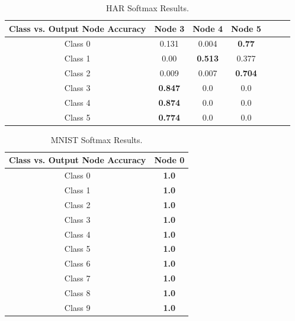 \documentclass[journal]{IEEEtran}
\begin{document}
  \begin{table}[!ht]
    \renewcommand{\arraystretch}{1.3}
    \caption{HAR Softmax Results.}
    \label{tab_har_sfx}
    \centering
    \begin{tabular}{|c|c|c|c|c|c|c|}
    \hline
    Class vs. Output Node Accuracy & Node 3 & Node 4 & Node 5\\
    \hline
    \hline
    Class 0    & 0.131  &  0.004    & \textbf{0.77}\\
    \hline
    Class 1    & 0.00  &  \textbf{0.513}    & 0.377\\
    \hline
    Class 2   & 0.009  &  0.007    & \textbf{0.704}\\
    \hline
    Class 3   & \textbf{0.847}  &  0.0    & 0.0\\
    \hline
    Class 4  & \textbf{0.874 } &  0.0    & 0.0\\
    \hline
    Class 5    & \textbf{0.774  }&  0.0    & 0.0\\
    \hline
    \end{tabular}
    \end{table}
    \begin{table}
      \renewcommand{\arraystretch}{1.3}
      \caption{MNIST Softmax Results.}
      \label{tab_mnist_sfx_all}
      \centering
      \begin{tabular}{|c|c|}
      \hline
      Class vs. Output Node Accuracy & Node 0 \\
      \hline
      \hline
      Class 0   &  \textbf{1.0}   \\
      \hline
      Class 1   &  \textbf{1.0}   \\
      \hline
      Class 2   &  \textbf{1.0}   \\
      \hline
      Class 3   &  \textbf{1.0}  \\
      \hline
      Class 4   &  \textbf{1.0}  \\
      \hline
      Class 5   &  \textbf{1.0}  \\
      \hline
      Class 6   &  \textbf{1.0}   \\
      \hline
      Class 7   &  \textbf{1.0}  \\
      \hline
      Class 8   &  \textbf{1.0}  \\
      \hline
      Class 9   &  \textbf{1.0}  \\
      \hline
      \end{tabular}
      \end{table}
\end{document}
